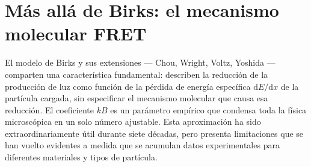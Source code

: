 \documentclass[11pt,a4paper]{article}
\begin{document}


\section{Más allá de Birks: el mecanismo molecular FRET}



El modelo de Birks y sus extensiones --- Chou, Wright, Voltz, Yoshida --- comparten una característica fundamental: describen la reducción de la producción de luz como función de la pérdida de energía específica $\mathrm{d}E/\mathrm{d}x$ de la partícula cargada, sin especificar el mecanismo molecular que causa esa reducción. El coeficiente $kB$ es un parámetro empírico que condensa toda la física microscópica en un solo número ajustable. Esta aproximación ha sido extraordinariamente útil durante siete décadas, pero presenta limitaciones que se han vuelto evidentes a medida que se acumulan datos experimentales para diferentes materiales y tipos de partícula.
\end{document}
